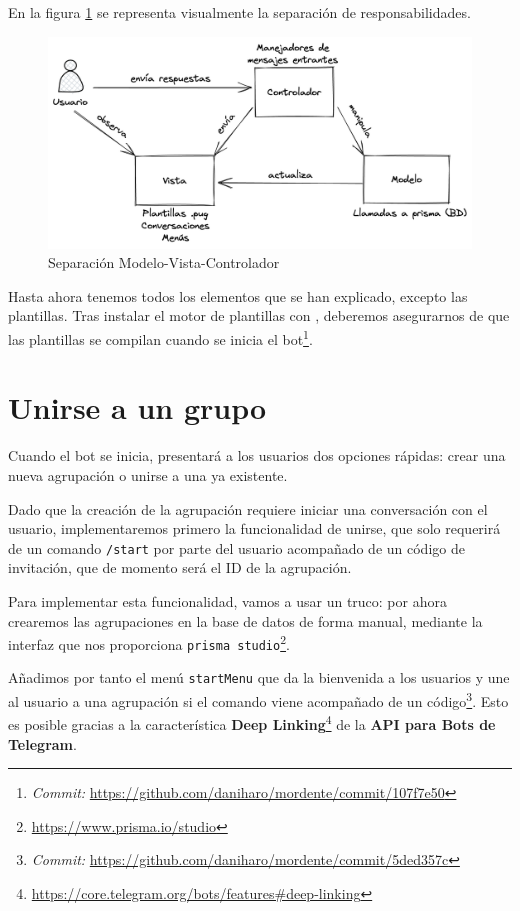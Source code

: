 En la figura \ref{fig:mvc} se representa visualmente la separación de responsabilidades.

\begin{figure}[h]
\centering
\includegraphics[width=\textwidth]{imagenes/implementacion/mvc.png}
\caption{Separación Modelo-Vista-Controlador}
\label{fig:mvc}
\end{figure}

Hasta ahora tenemos todos los elementos que se han explicado, excepto las plantillas. Tras instalar el motor de plantillas con , deberemos asegurarnos de que las plantillas se compilan cuando se inicia el bot\footnote{\textit{Commit:} \url{https://github.com/daniharo/mordente/commit/107f7e50}}.

\section{Unirse a un grupo}

Cuando el bot se inicia, presentará a los usuarios dos opciones rápidas: crear una nueva agrupación o unirse a una ya existente.

Dado que la creación de la agrupación requiere iniciar una conversación con el usuario, implementaremos primero la funcionalidad de unirse, que solo requerirá de un comando \texttt{/start} por parte del usuario acompañado de un código de invitación, que de momento será el ID de la agrupación.

Para implementar esta funcionalidad, vamos a usar un truco: por ahora crearemos las agrupaciones en la base de datos de forma manual, mediante la interfaz que nos proporciona \texttt{prisma studio}\footnote{\url{https://www.prisma.io/studio}}.

Añadimos por tanto el menú \texttt{startMenu} que da la bienvenida a los usuarios y une al usuario a una agrupación si el comando viene acompañado de un código\footnote{\textit{Commit:} \url{https://github.com/daniharo/mordente/commit/5ded357c}}. Esto es posible gracias a la característica \textbf{Deep Linking}\footnote{\url{https://core.telegram.org/bots/features\#deep-linking}} de la \textbf{API para Bots de Telegram}.


